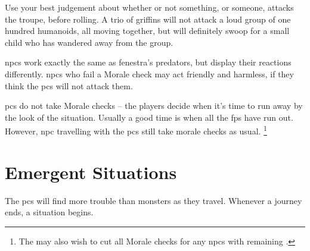 \begin{multicols}{2}
Use your best judgement about whether or not something, or someone, attacks the troupe, before rolling.
A trio of griffins will not attack a loud group of one hundred humanoids, all moving together, but will definitely swoop for a small child who has wandered away from the group.

\Glspl{npc} work exactly the same as \gls{fenestra}'s predators, but display their reactions differently.
\Glspl{npc} who fail a Morale check may act friendly and harmless, if they think the \glspl{pc} will not attack them.

\Glspl{pc} do not take Morale checks -- the players decide when it's time to run away by the look of the situation.
Usually a good time is when all the \glspl{fp} have run out.
%
However, \gls{npc} travelling with the \glspl{pc} still take morale checks as usual.%
\footnote{The  may also wish to cut all Morale checks for any \glspl{npc} with remaining .}%

\end{multicols}

\section{Emergent Situations}

The \glspl{pc} will find more trouble than monsters as they travel.
Whenever a journey ends, a situation begins.

